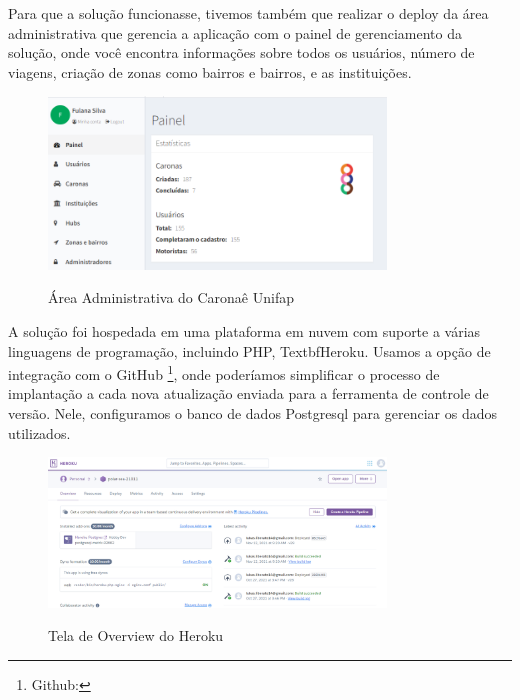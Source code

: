 Para que a solução funcionasse, tivemos também que realizar o deploy da área administrativa que gerencia a aplicação com o painel de gerenciamento da solução, onde você encontra informações sobre todos os usuários, número de viagens, criação de zonas como bairros e bairros, e as instituições.

\begin{figure}[H]
	\centering
	\caption{Área Administrativa do Caronaê Unifap}
	\includegraphics[width=0.8\textwidth]{./04-figuras/area-administrativa/painel_inicial.png}
	\label{fig:area-administrativa}
\end{figure}

A solução foi hospedada em uma plataforma em nuvem com suporte a várias linguagens de programação, incluindo PHP, Textbf{Heroku}. Usamos a opção de integração com o GitHub \footnote{Github: }, onde poderíamos simplificar o processo de implantação a cada nova atualização enviada para a ferramenta de controle de versão. Nele, configuramos o banco de dados Postgresql para gerenciar os dados utilizados.

\begin{figure}[H]
	\centering
	\caption{Tela de Overview do Heroku}
	\includegraphics[width=0.8\textwidth]{./04-figuras/area-administrativa/heroku.png}
	\label{fig:heroku}
\end{figure}





